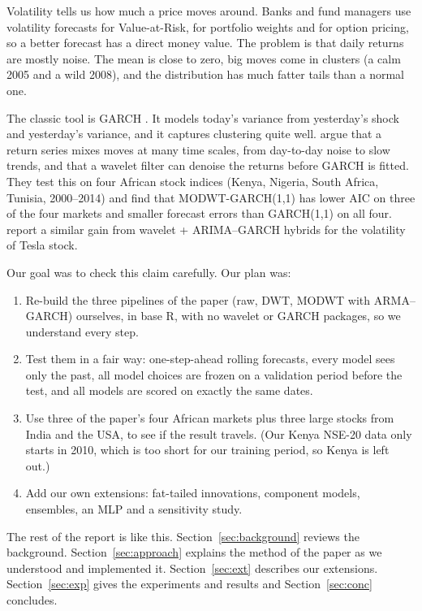 \documentclass{article}
\begin{document}
Volatility tells us how much a price moves around. Banks and fund managers use volatility forecasts for Value-at-Risk, for portfolio weights and for option pricing, so a better forecast has a direct money value. The problem is that daily returns are mostly noise. The mean is close to zero, big moves come in clusters (a calm 2005 and a wild 2008), and the distribution has much fatter tails than a normal one.

The classic tool is GARCH \cite{engle1982,bollerslev1986}. It models today's variance from yesterday's shock and yesterday's variance, and it captures clustering quite well. \citet{ismail2016} argue that a return series mixes moves at many time scales, from day-to-day noise to slow trends, and that a wavelet filter can denoise the returns before GARCH is fitted. They test this on four African stock indices (Kenya, Nigeria, South Africa, Tunisia, 2000--2014) and find that MODWT-GARCH(1,1) has lower AIC on three of the four markets and smaller forecast errors than GARCH(1,1) on all four. \citet{rubio2023} report a similar gain from wavelet + ARIMA--GARCH hybrids for the volatility of Tesla stock.

Our goal was to check this claim carefully. Our plan was:
\begin{enumerate}
\item Re-build the three pipelines of the paper (raw, DWT, MODWT with ARMA--GARCH) ourselves, in base R, with no wavelet or GARCH packages, so we understand every step.
\item Test them in a fair way: one-step-ahead rolling forecasts, every model sees only the past, all model choices are frozen on a validation period before the test, and all models are scored on exactly the same dates.
\item Use three of the paper's four African markets plus three large stocks from India and the USA, to see if the result travels. (Our Kenya NSE-20 data only starts in 2010, which is too short for our training period, so Kenya is left out.)
\item Add our own extensions: fat-tailed innovations, component models, ensembles, an MLP and a sensitivity study.
\end{enumerate}

The rest of the report is like this. Section~\ref{sec:background} reviews the background. Section~\ref{sec:approach} explains the method of the paper as we understood and implemented it. Section~\ref{sec:ext} describes our extensions. Section~\ref{sec:exp} gives the experiments and results and Section~\ref{sec:conc} concludes.
\end{document}
